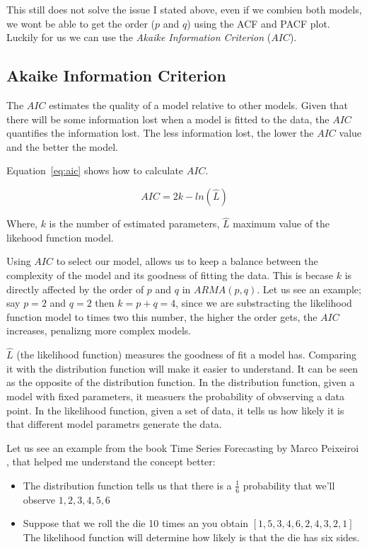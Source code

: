 \documentclass[journal]{IEEEtran}
\begin{document}
This still does not solve the issue I stated above, even if we combien both
models, we wont be able to get the order ($p$ and $q$) using the ACF and PACF
plot. Luckily for us we can use the \emph{Akaike Information Criterion}
($AIC$).

\subsection{Akaike Information Criterion}

The $AIC$ estimates the quality of a model relative to other models.  Given
that there will be some information lost when a model is fitted to the data,
the $AIC$ quantifies the information lost. The less information lost, the
lower the $AIC$ value and the better the model.

Equation~\ref{eq:aic} shows how to calculate $AIC$.

\begin{equation}
    AIC = 2k - ln(\hat{L})
    \label{eq:aic}
\end{equation}

Where, $k$ is the number of estimated parameters, $\hat{L}$ maximum value of
the likehood function model. 

Using $AIC$ to select our model, allows us to keep a balance between the
complexity of the model and its goodness of fitting the data. This is becase
$k$ is directly affected by the order of $p$ and $q$ in $ARMA(p,q)$. Let us
see an example; say $p = 2$ and $q=2$ then $k = p + q = 4$, since we are
substracting the likelihood function model to times two this number, the
higher the order gets, the $AIC$ increases, penalizng more complex models.

$\hat{L}$ (the likelihood function) measures the goodness of fit a model has.
Comparing it with the distribution function will make it easier to understand.
It can be seen as the opposite of the distribution function. In the
distribution function, given a model with fixed parameters, it measuers the
probability of obvserving a data point. In the likelihood function, given a
set of data, it tells us  how likely it is that different model parametrs
generate the data.

Let us see an example from the book Time Series Forecasting by Marco Peixeiroi
\cite{timeseries}, that helped me understand the concept better:

\begin{itemize}
    \item  
        The distribution function tells us that there is a $\frac{1}{6}$
        probability that we'll observe ${1,2,3,4,5,6}$
    \item  
        Suppose that we roll the die 10 times an you obtain
        $[1,5,3,4,6,2,4,3,2,1]$ The likelihood function will determine how
        likely is that the die has six sides.
\end{itemize}
\end{document}
